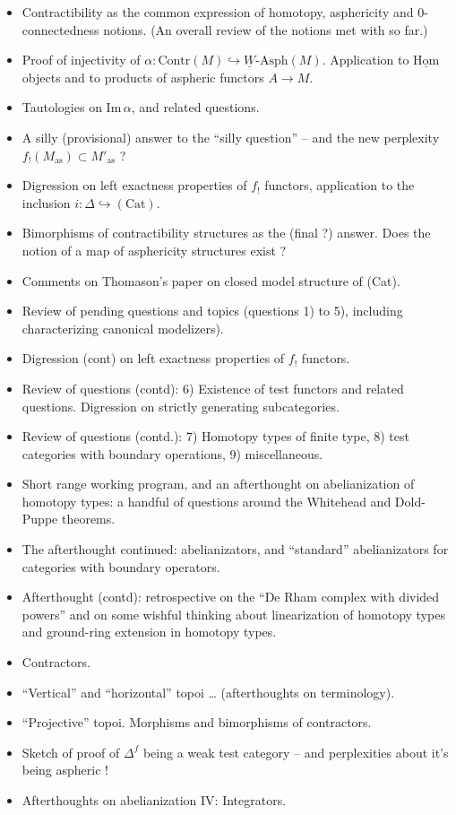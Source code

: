 \documentclass[11pt,a4paper]{article}
\begin{document}
\begin{itemize}
  \item[(81.)] Contractibility as the common expression of homotopy, asphericity and 0-connectedness notions. (An overall review of the notions met with so far.)
  \item[82.] Proof of injectivity of $\alpha\colon \mathrm{Contr}(M)\hookrightarrow \underline{W}\text{-}\mathrm{Asph}(M)$. Application to $\underline{\mathrm{Hom}}$ objects and to products of aspheric functors $A\to M$.
  \item[83.] Tautologies on $\mathrm{Im}\,\alpha$, and related questions.
  \item[84.] A silly (provisional) answer to the ``silly question''  -- and the new perplexity $f_{!}(M_{\mathrm{as}})\subset M'_{\mathrm{as}}$ ?
  \item[85.] Digression on left exactness properties of $f_{!}$ functors, application to the inclusion $i\colon \Delta\hookrightarrow(\mathrm{Cat})$.
  \item[86.] Bimorphisms of contractibility structures as the (final ?) answer. Does the notion of a map of asphericity structures exist ?
  \item[87.] Comments on Thomason's paper on closed model structure of (Cat).
  \item[88.] Review of pending questions and topics (questions 1) to 5), including characterizing canonical modelizers).
  \item[89.] Digression (cont\struck{\ill{}}) on left exactness properties of $f_{!}$ functors.
  \item[90.] Review of questions (contd): 6) Existence of test functors and related questions. Digression on strictly generating subcategories.
  \item[91.] Review of questions (contd.): 7) Homotopy types of finite type, 8) test categories with boundary operations, 9) miscellaneous.
  \item[92.] Short range working program, and an afterthought on abelianization of homotopy types: a handful of questions around the Whitehead and Dold-Puppe theorems. 
  \item[93.] The afterthought continued: abelianizators, and ``standard'' abelianizators for categories with boundary operators.
  \item[94.] Afterthought (contd): retrospective on the ``De Rham complex with divided powers'' and on some wishful thinking about linearization of homotopy types and  ground-ring extension in homotopy types.
  \item[95.] Contractors.
  \item[96.] ``Vertical'' and ``horizontal'' topoi … (afterthoughts on terminology).
  \item[97.] ``Projective'' topoi. Morphisms and bimorphisms of contractors.
  \item[98.] Sketch of proof of $\Delta^{f}$ being a weak test category -- and perplexities about it's being aspheric !
  \item[99.] Afterthoughts on abelianization IV: Integrators.
\end{itemize}
\end{document}

